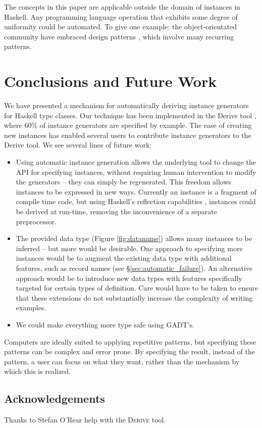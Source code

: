 \documentclass[preprint]{sigplanconf}
\newcommand{\derive}{\textsc{Derive}}
\begin{document}
The concepts in this paper are applicable outside the domain of instances in Haskell. Any programming language operation that exhibits some degree of uniformity could be automated. To give one example: the object-orientated community have embraced design patterns \cite{design_patterns}, which involve many recurring patterns.

\section{Conclusions and Future Work}
\label{sec:conclusion}

We have presented a mechanism for automatically deriving instance generators for Haskell type classes. Our technique has been implemented in the Derive tool \cite{derive}, where 60\% of instance generators are specified by example. The ease of creating new instances has enabled several users to contribute instance generators to the Derive tool. We see several lines of future work:

\begin{itemize}
\item Using automatic instance generation allows the underlying tool to change the API for specifying instances, without requiring human intervention to modify the generators -- they can simply be regenerated. This freedom allows instances to be expressed in new ways. Currently an instance is a fragment of compile time code, but using Haskell's reflection capabilities \cite{lammel:syb2}, instances could be derived at run-time, removing the inconvenience of a separate preprocessor.
\item The provided data type (Figure \ref{fig:dataname}) allows many instances to be inferred -- but more would be desirable. One approach to specifying more instances would be to augment the existing data type with additional features, such as record names (see \S\ref{sec:automatic_failure}). An alternative approach would be to introduce new data types with features specifically targeted for certain types of definition. Care would have to be taken to ensure that these extensions do not substantially increase the complexity of writing examples.
\item We could make everything more type safe using GADT's.
\end{itemize}

Computers are ideally suited to applying repetitive patterns, but specifying these patterns can be complex and error prone. By specifying the result, instead of the pattern, a user can focus on what they want, rather than the mechanism by which this is realized.


\subsection*{Acknowledgements}

Thanks to Stefan O'Rear help with the \derive{} tool.


\balance



\end{document}
